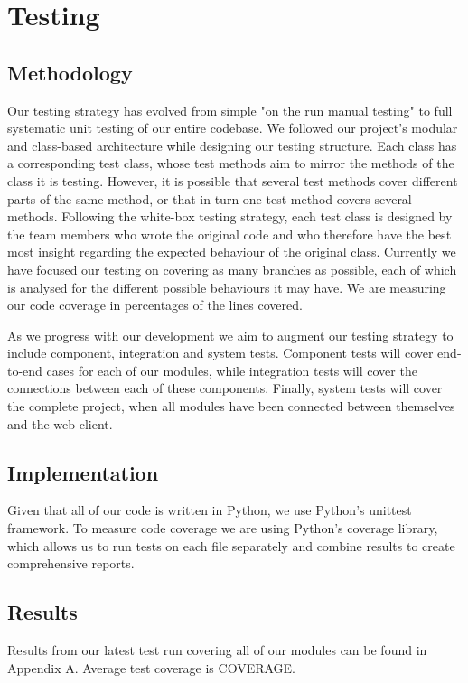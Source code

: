 \documentclass[12pt]{article}
\begin{document}
\section{Testing}

\subsection{Methodology}
Our testing strategy has evolved from simple "on the run manual testing" to full systematic unit testing of our entire codebase. We followed our project's modular and class-based architecture while designing our testing structure. Each class has a corresponding test class, whose test methods aim to mirror the methods of the class it is testing. However, it is possible that several test methods cover different parts of the same method, or that in turn one test method covers several methods. Following the white-box testing strategy, each test class is designed by the team members who wrote the original code and who therefore have the best most insight regarding the expected behaviour of the original class. Currently we have focused our testing on covering as many branches as possible, each of which is analysed for the different possible behaviours it may have. We are measuring our code coverage in percentages of the lines covered. 

As we progress with our development we aim to augment our testing strategy to include component, integration and system tests. Component tests will cover end-to-end cases for each of our modules, while integration tests will cover the connections between each of these components. Finally, system tests will cover the complete project, when all modules have been connected between themselves and the web client.

\subsection{Implementation}
Given that all of our code is written in Python, we use Python's unittest framework. To measure code coverage we are using Python's coverage library, which allows us to run tests on each file separately and combine results to create comprehensive reports.

\subsection{Results}
Results from our latest test run covering all of our modules can be found in Appendix A. Average test coverage is COVERAGE.
\end{document}

